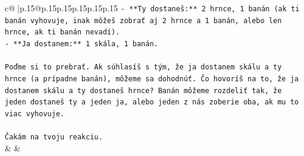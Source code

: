 \documentclass{article}
\begin{document}
{\begin{supertabular}{c@{$\;$}|p{.15\linewidth}@{}p{.15\linewidth}p{.15\linewidth}p{.15\linewidth}p{.15\linewidth}p{.15\linewidth}}
{{{\texttt{{-} **Ty dostaneš:** 2 hrnce, 1 banán (ak ti banán vyhovuje, inak môžeš zobrať aj 2 hrnce a 1 banán, alebo len hrnce, ak ti banán nevadí).} \\
\texttt{{-} **Ja dostanem:** 1 skála, 1 banán.} \\
\\ 
\texttt{Poďme si to prebrať. Ak súhlasíš s tým, že ja dostanem skálu a ty hrnce (a prípadne banán), môžeme sa dohodnúť. Čo hovoríš na to, že ja dostanem skálu a ty dostaneš hrnce? Banán môžeme rozdeliť tak, že jeden dostaneš ty a jeden ja, alebo jeden z nás zoberie oba, ak mu to viac vyhovuje.} \\
\\ 
\texttt{Čakám na tvoju reakciu.} \\
            }
        }
    }
    & & \\ \\


\end{supertabular}}
\end{document}
